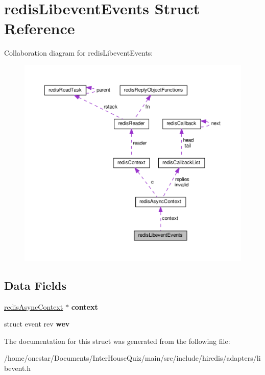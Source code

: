 \hypertarget{structredis_libevent_events}{\section{redis\+Libevent\+Events Struct Reference}
\label{structredis_libevent_events}
}


Collaboration diagram for redis\+Libevent\+Events\+:\nopagebreak
\begin{figure}[H]
\begin{center}
\leavevmode
\includegraphics[width=350pt]{structredis_libevent_events__coll__graph}
\end{center}
\end{figure}
\subsection*{Data Fields}
\begin{DoxyCompactItemize}
\item 
\hypertarget{structredis_libevent_events_a5764ffeda6751a7e3eec0eb29d402bde}{\hyperlink{structredis_async_context}{redis\+Async\+Context} $\ast$ {\bfseries context}}\label{structredis_libevent_events_a5764ffeda6751a7e3eec0eb29d402bde}

\item 
\hypertarget{structredis_libevent_events_a74f445c36ce2003c3c731e6f65e8bc32}{struct event rev {\bfseries wev}}\label{structredis_libevent_events_a74f445c36ce2003c3c731e6f65e8bc32}

\end{DoxyCompactItemize}


The documentation for this struct was generated from the following file\+:\begin{DoxyCompactItemize}
\item 
/home/onestar/\+Documents/\+Inter\+House\+Quiz/main/src/include/hiredis/adapters/libevent.\+h\end{DoxyCompactItemize}
